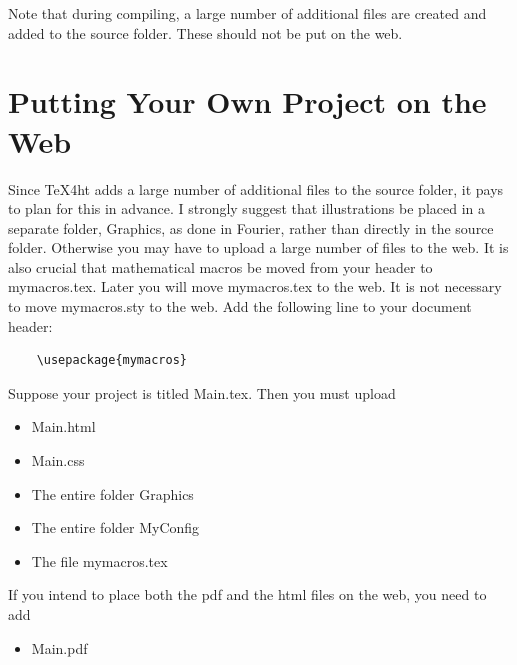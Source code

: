 \documentclass[11pt, oneside]{article}   	%
\begin{document}
Note that during compiling, a large number of additional files are created and added to the
source folder. These should not be put on the web.

\newpage
\section{Putting Your Own Project on the Web}

Since TeX4ht  adds a large number of additional files to the source folder,  it pays
to plan for this in advance.  I strongly suggest that illustrations be placed in a separate folder, Graphics,
as done in Fourier, rather than directly in the source folder. Otherwise you may have to upload a large number of files to the web. It is also crucial that mathematical macros be moved from your header
to mymacros.tex. Later you will move mymacros.tex to the web. It is not necessary to move
mymacros.sty to the web. Add the following line to your document header:
\begin{verbatim}
    \usepackage{mymacros} 
\end{verbatim}


Suppose your project
is titled Main.tex. Then you must upload
\begin{itemize}
\item Main.html
\item Main.css
\item The entire folder Graphics
\item The entire folder MyConfig
\item The file mymacros.tex
\end{itemize}
If you intend to place both the pdf and the html files on the web, you need to add
\begin{itemize}
\item Main.pdf
\end{itemize}
 
\end{document}
